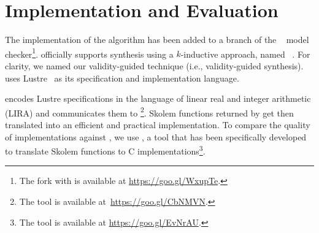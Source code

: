 \section{Implementation and Evaluation}
\label{sec:impl}

The implementation of the algorithm has been added to a branch of the  \jkind~\cite{jkind} model checker\footnote{The \jkind fork with \jsynvg is available at \url{https://goo.gl/WxupTe}.}.  \jkind officially supports synthesis
using a $k$-inductive approach, named \jsyn~\cite{KatisFGBGW16}. For clarity, we named
our validity-guided technique \jsynvg (i.e., validity-guided synthesis). \jkind uses Lustre~\cite{lustrev6} as its specification and implementation language.
\iffalse
, which functions as an intermediate representation to the Architecture Analysis and Design Language (\textsc{AADL})~\cite{feiler2006architecture}.
The latter is a high-level specification and analysis language with which
contracts are expressed, using the Assume-Guarantee Reasoning (\textsc{AGREE})
framework~\cite{NFM2012:CoGaMiWhLaLu}.
\andrew{it seems strange to be talking about AADL and maybe even AGREE  at all here.}

\fi
%
\jsynvg encodes Lustre specifications in the language of
linear real and integer arithmetic (LIRA)
and communicates them to \aeval\footnote{The \aeval tool is available at~\url{https://goo.gl/CbNMVN}.}.
%
%
Skolem functions returned by \aeval get then translated %
into an efficient and practical implementation. To compare the quality of implementations against \jsyn, we use
\smtlibtoc, a tool that has been specifically developed to translate
  Skolem functions to C implementations\footnote{The \smtlibtoc tool is available at \url{https://goo.gl/EvNrAU}.}.




